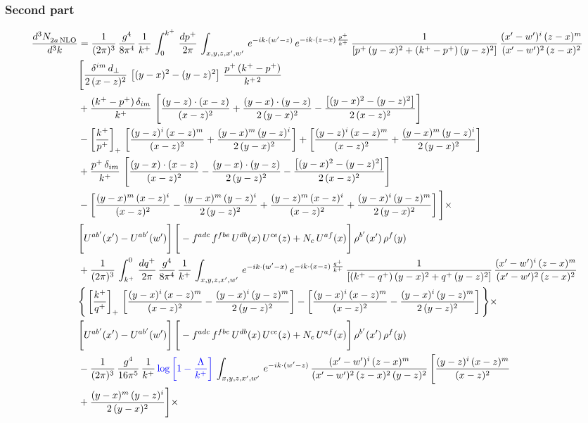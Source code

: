 \documentclass[9pt]{article}
\newcommand{\new}[1]{{\color{blue}#1}}
\numberwithin{equation}{section}
\begin{document}
\subsubsection*{Second part}
\begin{align}
    \frac{d^{3}N_{2a\,\rm NLO}^{\rm}}{d^{3}k}  & =  \frac{1}{(2\pi)^{3}}\, \frac{g^{4}}{8\pi^{4}}\,\frac{1}{k^{+}}\,\int_{0}^{k^{+}}\, \frac{dp^{+}}{2\pi}\,\int_{x,y,z,x',w'}\,e^{-ik\cdot(w'-z)}\,e^{-ik\cdot (z-x)\,\frac{p^{+}}{k^{+}}}\,\frac{1}{\left[p^{+}\,(y-x)^{2}+(k^{+}-p^{+})\,(y-z)^{2}\right]}\, \frac{(x'-w')^{i}\,(z-x)^{m}}{(x'-w')^{2}\,(z-x)^{2}} \notag \\ & \Bigg[\frac{\delta^{im}\,d_{\perp}}{2\,(x-z)^{2}}\,\left[(y-x)^{2}-(y-z)^{2}\right]\,\frac{p^{+}\,(k^{+}-p^{+})}{k^{+\,2}}\notag \\ & +\frac{(k^{+}-p^{+})\,\delta_{im}}{k^{+}}\,\left[\frac{(y-z)\cdot (x-z)}{(x-z)^{2}}+\frac{(y-x)\cdot (y-z)}{2\,(y-x)^{2}}-\frac{\left[(y-x)^{2}-(y-z)^{2}\right]}{2\,(x-z)^{2}}\right]\notag \\ & -\left[\frac{k^{+}}{p^{+}}\right]_{+}\,\left[\frac{(y-z)^{i}\,(x-z)^{m}}{(x-z)^{2}}+\frac{(y-x)^{m}\,(y-z)^{i}}{2\,(y-x)^{2}}\right]+ \left[\frac{(y-z)^{i}\,(x-z)^{m}}{(x-z)^{2}}+\frac{(y-x)^{m}\,(y-z)^{i}}{2\,(y-x)^{2}}\right]\notag \\ & +\frac{p^{+}\,\delta_{im}}{k^{+}}\,\left[\frac{(y-x)\cdot (x-z)}{(x-z)^{2}}-\frac{(y-x)\cdot (y-z)}{2\,(y-z)^{2}}-\frac{\left[(y-x)^{2}-(y-z)^{2}\right]}{2\,(x-z)^{2}}\right]\notag \\ &-\left[\frac{(y-x)^{m}\,(x-z)^{i}}{(x-z)^{2}}-\frac{(y-x)^{m}\,(y-z)^{i}}{2\,(y-z)^{2}}+\frac{(y-z)^{m}\,(x-z)^{i}}{(x-z)^{2}}+\frac{(y-x)^{i}\,(y-z)^{m}}{2\,(y-x)^{2}}\right]\Bigg]\times \notag \\ & \Bigg[U^{ab'}(x')-U^{ab'}(w')\Bigg]\,\Bigg[-f^{adc}\,f^{fbe}\,U^{db}(x)\,U^{ce}(z)+N_{c}\,U^{af}(x)\Bigg]\,\rho^{b'}(x')\,\rho^{f}(y)\notag \\ & + \frac{1}{(2\pi)^{3}}\,\int^{0}_{k^{+}}\, \frac{dq^{+}}{2\pi} \,\frac{g^{4}}{8\pi^{4}}\,\frac{1}{k^{+}}\, \int_{x,y,z,x',w'}\,e^{-ik\cdot(w'-x)}\,e^{-ik\cdot (x-z)\,\frac{q^{+}}{k^{+}}}\, \frac{1}{\left[(k^{+}-q^{+})\,(y-x)^{2}+q^{+}\,(y-z)^{2}\right]}\, \frac{(x'-w')^{i}\,(z-x)^{m}}{(x'-w')^{2}\,(z-x)^{2}} \notag \\ &\Bigg\{\left[\frac{k^{+}}{q^{+}}\right]_{+}\,\left[\frac{(y-x)^{i}\,(x-z)^{m}}{(x-z)^{2}}-\frac{(y-x)^{i}\,(y-z)^{m}}{2\,(y-z)^{2}}\right] -\left[\frac{(y-x)^{i}\,(x-z)^{m}}{(x-z)^{2}}-\frac{(y-x)^{i}\,(y-z)^{m}}{2\,(y-z)^{2}}\right]\Bigg\}\times\,\notag \\ & \Bigg[U^{ab'}(x')-U^{ab'}(w')\Bigg]\,\Bigg[-f^{adc}\,f^{fbe}\,U^{db}(x)\,U^{ce}(z)+N_{c}\,U^{af}(x)\Bigg]\,\rho^{b'}(x')\,\rho^{f}(y)\notag \\ & - \frac{1}{(2\pi)^{3}}\, \frac{g^{4}}{16\pi^{5}}\,\frac{1}{k^{+}}\,\new{\log{\left[1-\frac{\Lambda}{k^{+}}\right]}}\, \int_{x,y,z,x',w'}\, e^{-ik\cdot(w'-z)}\,\frac{(x'-w')^{i}\,(z-x)^{m}}{(x'-w')^{2}\,(z-x)^{2}\, (y-z)^{2}}\,\Bigg[\frac{(y-z)^{i}\,(x-z)^{m}}{(x-z)^{2}}\notag \\ & +\frac{(y-x)^{m}\,(y-z)^{i}}{2\,(y-x)^{2}}\Bigg]\times\, 
\end{align}
\end{document}
